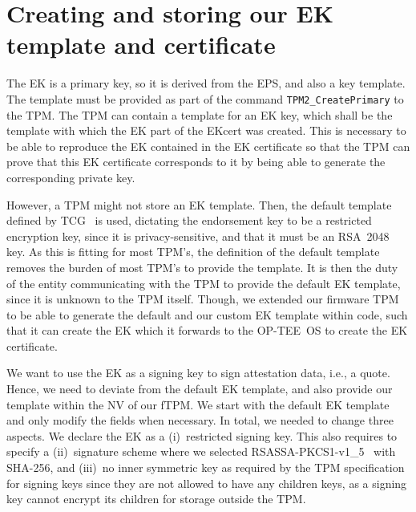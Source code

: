 \section{Creating and storing our EK template and certificate}

The EK is a primary key, so it is derived from the EPS, and also a key template.
The template must be provided as part of the command \texttt{TPM2\_CreatePrimary} to the TPM\@.
The TPM can contain a template for an EK key, which shall be the template with which the EK part of the EKcert was created.
This is necessary to be able to reproduce the EK contained in the EK certificate so that the TPM can prove that this EK certificate corresponds to it by being able to generate the corresponding private key.

However, a TPM might not store an EK template.
Then, the default template defined by TCG~\cite{tcg-ek} is used, dictating the endorsement key to be a restricted encryption key, since it is privacy-sensitive, and that it must be an RSA~2048 key.
As this is fitting for most TPM's, the definition of the default template removes the burden of most TPM's to provide the template.
It is then the duty of the entity communicating with the TPM to provide the default EK template, since it is unknown to the TPM itself.
Though, we extended our firmware TPM to be able to generate the default and our custom EK template within code, such that it can create the EK which it forwards to the OP-TEE~OS to create the EK certificate.


We want to use the EK as a signing key to sign attestation data, i.e., a quote.
Hence, we need to deviate from the default EK template, and also provide our template within the NV of our fTPM\@.
We start with the default EK template and only modify the fields when necessary.
In total, we needed to change three aspects.
We declare the EK as a (i)~restricted signing key.
This also requires to specify a (ii)~signature scheme where we selected RSASSA-PKCS1-v1\_5~\cite{Jonsson2003} with SHA-256, and (iii)~no inner symmetric key as required by the TPM specification~\cite{tpm} for signing keys since they are not allowed to have any children keys, as a signing key cannot encrypt its children for storage outside the TPM\@.


